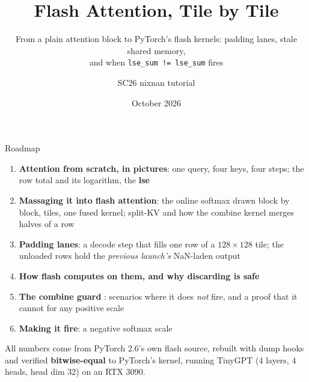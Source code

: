 \documentclass[aspectratio=169,11pt]{beamer}
\title[Flash attention, tile by tile]{Flash Attention, Tile by Tile}
\subtitle{From a plain attention block to PyTorch's flash kernels: padding lanes, stale shared memory,\\ and when \texttt{lse\_sum != lse\_sum} fires}
\author[SC26 nixnan tutorial]{SC26 nixnan tutorial}
\institute[]{\texttt{flash-attn-expt}, branch \texttt{Flash-Attn}}
\date{October 2026}
\newcommand{\code}[1]{\texttt{\detokenize{#1}}}
\newcommand{\NaN}{NaN}
\begin{document}
\begin{frame}
\titlepage
\end{frame}

\begin{frame}{Roadmap}
\begin{enumerate}
\item \textbf{Attention from scratch, in pictures}: one query, four keys, four steps; the row total and its logarithm, the \textbf{lse}
\item \textbf{Massaging it into flash attention}: the online softmax drawn block by block, tiles, one fused kernel; split-KV and how the combine kernel merges halves of a row
\item \textbf{Padding lanes}: a decode step that fills one row of a $128\times128$ tile; the unloaded rows hold the \emph{previous launch's} \NaN-laden output
\item \textbf{How flash computes on them, and why discarding is safe}
\item \textbf{The combine guard \code{lse_sum != lse_sum}}: scenarios where it does \emph{not} fire, and a proof that it cannot for any positive scale
\item \textbf{Making it fire}: a negative softmax scale
\end{enumerate}
\vspace{2mm}
\small All numbers come from PyTorch 2.6's own flash source, rebuilt with dump hooks and verified \textbf{bitwise-equal} to PyTorch's kernel, running TinyGPT (4 layers, 4 heads, head dim 32) on an RTX 3090.
\end{frame}

\end{document}

